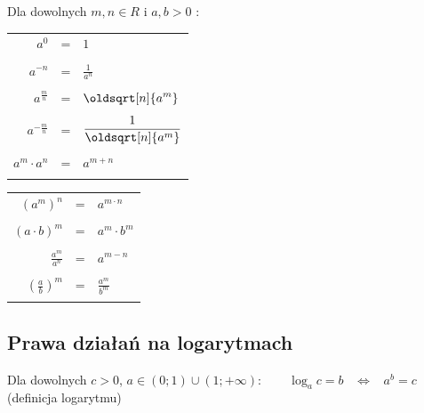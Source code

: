 \documentclass[10pt, twoside, fleqn]{article}
\renewcommand*{\sqrt}[2][\ ]{\oldsqrt[#1]{#2}}
\begin{document}
		Dla dowolnych $m,n \in R$ i $a,b > 0$ :
		\begin{multicols}{2}				
		\begin{tabular}{rcl}
			$\displaystyle a^{0}$ 				&=& $1$										\\ \\			
			$\displaystyle a^{-n}$ 				&=& $\displaystyle\frac{1}{a^n}$			\\ \\		
			$\displaystyle a^{\frac{m}{n}}$ 	&=&	$\displaystyle\sqrt[n]{a^m}$			\\ \\
			$\displaystyle a^{-\frac{m}{n}}$ 	&=&	$\displaystyle\frac{1}{\sqrt[n]{a^m}}$	\\ \\			
			$a^m \cdot a^n$ 					&=& $a^{m+n}$				\\ \\	
		\end{tabular}
		
		\begin{tabular}{rcl}		
			$(a^m)^n$ 							&=& $a^{m \cdot n}$			\\ \\
			$(a \cdot b)^m$ 					&=&	$a^m \cdot b^m$			\\ \\		
			$\displaystyle \frac{a^m}{a^n}$ 				&=& $\displaystyle a^{m-n}$		\\ \\			
			$\displaystyle \left( \frac{a}{b} \right)^m $ 	&=& $\displaystyle \frac{a^m}{b^m} $\\ \\			
		\end{tabular}		
		\end{multicols}

	\subsection{Prawa działań na logarytmach}	
	
		Dla dowolnych $c > 0$, $a \in (0;1)\cup(1;+\infty): \hspace{20pt}$
			$\displaystyle  \log_a{c}=b 
								\hspace{10pt} \Leftrightarrow \hspace{10pt} 
							a^b=c \hspace{10pt}$ (definicja logarytmu)	\\	
									
\end{document}
